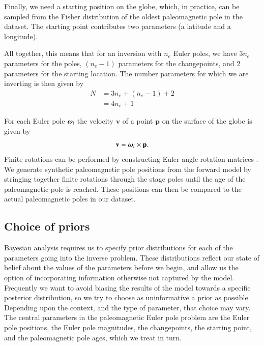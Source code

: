 \documentclass[preprint,12pt,authoryear]{elsarticle}
\newcommand{\mitbf}[1]{\hbox{\mathversion{bold}$#1$}}
\begin{document}
Finally, we need a starting position on the globe, which, in practice, can be sampled
from the Fisher distribution of the oldest paleomagnetic pole in the dataset.
The starting point contributes two parameters (a latitude and a longitude).

All together, this means that for an inversion with $n_e$ Euler poles, 
we have $3 n_e$ parameters for the poles, $(n_e-1)$ parameters for the changepoints,
and 2 parameters for the starting location.
The number parameters for which we are inverting is then given by
\begin{equation}
\begin{aligned}
N &= 3 n_e + (n_e -1) + 2 \\
 &= 4 n_e + 1
\end{aligned}
\label{eq:n_parameters}
\end{equation}

For each Euler pole $\mitbf{\omega}_i$ the velocity $\mathbf{v}$ of a point 
$\mathbf{p}$ on the surface of the globe is given by
\begin{equation}
\mathbf{v} = \mitbf{\omega}_i \times \mathbf{p}.
\label{eq:rigid_rotation}
\end{equation}
Finite rotations can be performed by constructing Euler angle rotation matrices \citep[cf.][]{goldstein1965classical}. 
We generate synthetic paleomagnetic pole positions from the forward model by stringing together
finite rotations through the stage poles until the age of the paleomagnetic pole
is reached. These positions can then be compared to the actual paleomagnetic poles in our dataset.

\subsection{Choice of priors}
\label{sec:priors}

Bayesian analysis requires us to specify prior distributions for each of the parameters going into the inverse problem.
These distributions reflect our state of belief about the values of the parameters before we begin,
and allow us the option of incorporating information otherwise not captured by the model.
Frequently we want to avoid biasing the results of the model towards a specific posterior distribution,
so we try to choose as uninformative a prior as possible. Depending upon the context, and the type
of parameter, that choice may vary.
The central parameters in the paleomagnetic Euler pole problem are the Euler pole positions,
the Euler pole magnitudes, the changepoints, the starting point, and the paleomagnetic pole ages, which we treat in turn.
\end{document}
